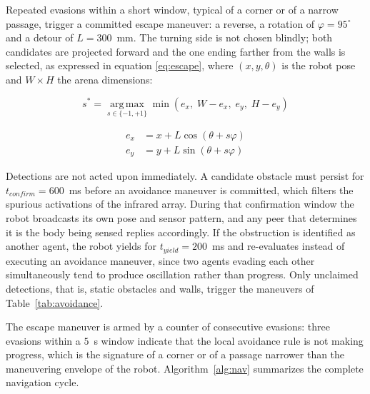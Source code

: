 \documentclass[conference]{IEEEtran}
\begin{document}
Repeated evasions within a short window, typical of a corner or of a narrow
passage, trigger a committed escape maneuver: a reverse, a rotation of
$\varphi = 95^\circ$ and a detour of $L = 300$~mm. The turning side is not
chosen blindly; both candidates are projected forward and the one ending farther
from the walls is selected, as expressed in equation \ref{eq:escape}, where
$(x,y,\theta)$ is the robot pose and $W \times H$ the arena dimensions:

\begin{equation}
s^{*} = \operatorname*{arg\,max}_{s \in \{-1,+1\}}
\min \left( e_x,\; W - e_x,\; e_y,\; H - e_y \right)
\label{eq:escape}
\end{equation}

\begin{equation}
\begin{aligned}
e_x &= x + L\cos(\theta + s\varphi) \\
e_y &= y + L\sin(\theta + s\varphi)
\end{aligned}
\label{eq:escape_proj}
\end{equation}

Detections are not acted upon immediately. A candidate obstacle must persist for
$t_{confirm} = 600$~ms before an avoidance maneuver is committed, which filters
the spurious activations of the infrared array. During that confirmation window
the robot broadcasts its own pose and sensor pattern, and any peer that
determines it is the body being sensed replies accordingly. If the obstruction is
identified as another agent, the robot yields for $t_{yield} = 200$~ms and
re-evaluates instead of executing an avoidance maneuver, since two agents
evading each other simultaneously tend to produce oscillation rather than
progress. Only unclaimed detections, that is, static obstacles and walls, trigger
the maneuvers of Table~\ref{tab:avoidance}.

The escape maneuver is armed by a counter of consecutive evasions: three
evasions within a $5$~s window indicate that the local avoidance rule is not
making progress, which is the signature of a corner or of a passage narrower than
the maneuvering envelope of the robot. Algorithm~\ref{alg:nav} summarizes the
complete navigation cycle.
\end{document}
